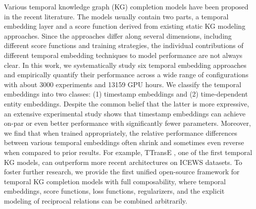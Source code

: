 Various temporal knowledge graph (KG) completion models have been proposed in the recent literature. The models usually contain two parts, a temporal embedding layer and a score function derived from existing static KG modeling approaches. Since the approaches differ along several dimensions, including different score functions and training strategies, the individual contributions of different temporal embedding techniques to model performance are not always clear. In this work, we systematically study six temporal embedding approaches and empirically quantify their performance across a wide range of configurations with about 3000 experiments and 13159 GPU hours. We classify the temporal embeddings into two classes: (1) timestamp embeddings and (2) time-dependent entity embeddings. Despite the common belief that the latter is more expressive, an extensive experimental study shows that timestamp embeddings can achieve on-par or even better performance with significantly fewer parameters. Moreover, we find that when trained appropriately, the relative performance differences between various temporal embeddings often shrink and sometimes even reverse when compared to prior results. For example, TTransE \citep{leblay2018deriving}, one of the first temporal KG models, can outperform more recent architectures on ICEWS datasets. To foster further research, we provide the first unified open-source framework for temporal KG completion models with full composability, where temporal embeddings, score functions, loss functions, regularizers, and the explicit modeling of reciprocal relations can be combined arbitrarily.

